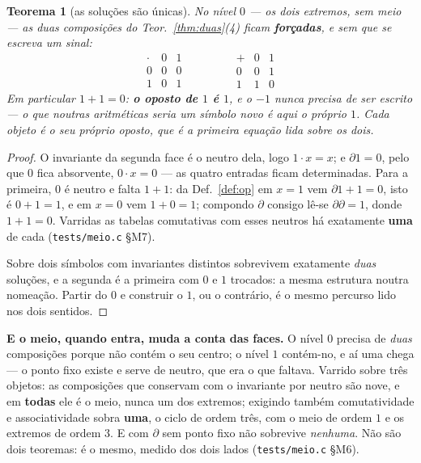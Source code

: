 \documentclass[11pt,a4paper]{article}
\newcommand{\code}[1]{\texttt{\small #1}}
\newtheorem{teorema}{Teorema}
\begin{document}
\begin{teorema}[as soluções são únicas]\label{thm:B}
No nível $0$ --- os dois extremos, sem meio --- as duas composições do
Teor.~\ref{thm:duas}(4) ficam \textbf{forçadas}, e sem que se escreva um sinal:
\[
\begin{array}{c|cc}
\cdot & 0 & 1\\\hline
0 & 0 & 0\\
1 & 0 & 1
\end{array}
\qquad\qquad
\begin{array}{c|cc}
+ & 0 & 1\\\hline
0 & 0 & 1\\
1 & 1 & 0
\end{array}
\]
Em particular $1+1=0$: \textbf{o oposto de $1$ é $1$}, e o $-1$ nunca precisa de
ser escrito --- o que noutras aritméticas seria um símbolo novo é aqui o próprio
$1$. Cada objeto é o seu próprio oposto, que é a primeira equação lida sobre os
dois.
\end{teorema}

\begin{proof}
O invariante da segunda face é o neutro dela, logo $1\cdot x=x$; e $\partial
1=0$, pelo que $0$ fica absorvente, $0\cdot x=0$ --- as quatro entradas ficam
determinadas. Para a primeira, $0$ é neutro e falta $1+1$: da Def.~\ref{def:op}
em $x=1$ vem $\partial 1+1=0$, isto é $0+1=1$, e em $x=0$ vem $1+0=1$; compondo
$\partial$ consigo lê-se $\partial\partial=1$, donde $1+1=0$. Varridas as
tabelas comutativas com esses neutros há exatamente \textbf{uma} de cada
(\code{tests/meio.c} §M7).

Sobre dois símbolos com invariantes distintos sobrevivem exatamente \emph{duas}
soluções, e a segunda é a primeira com $0$ e $1$ trocados: a mesma estrutura
noutra nomeação. Partir do $0$ e construir o $1$, ou o contrário, é o mesmo
percurso lido nos dois sentidos.
\end{proof}

\medskip\noindent\textbf{E o meio, quando entra, muda a conta das faces.} O
nível $0$ precisa de \emph{duas} composições porque não contém o seu centro; o
nível $1$ contém-no, e aí uma chega --- o ponto fixo existe e serve de neutro,
que era o que faltava. Varrido sobre três objetos: as composições que conservam
com o invariante por neutro são nove, e em \textbf{todas} ele é o meio, nunca um
dos extremos; exigindo também comutatividade e associatividade sobra
\textbf{uma}, o ciclo de ordem três, com o meio de ordem $1$ e os extremos de
ordem $3$. E com $\partial$ sem ponto fixo não sobrevive \emph{nenhuma}. Não são
dois teoremas: é o mesmo, medido dos dois lados
(\code{tests/meio.c} §M6).
\end{document}
